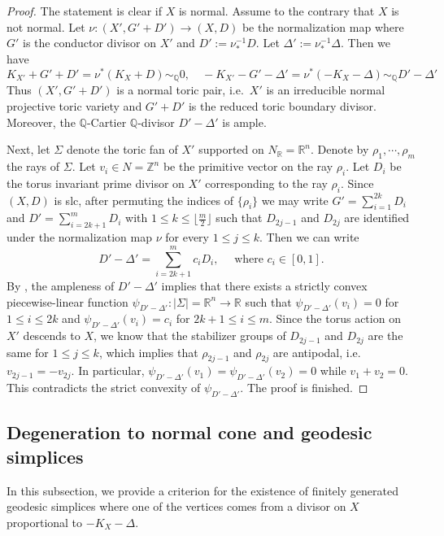 \documentclass[reqno, 12pt]{amsart}
\theoremstyle{definition}
\newcommand{\bR}{\mathbb{R}}
\newcommand{\bQ}{\mathbb{Q}}
\newcommand{\bZ}{\mathbb{Z}}
\numberwithin{equation}{section}
\begin{document}
\begin{proof}
The statement is clear if $X$ is normal. 
Assume to the contrary that $X$ is not normal.
Let $\nu: (X', G'+ D')\to (X,D)$ be the normalization map where $G'$ is the conductor divisor on $X'$ and $D':= \nu_*^{-1} D$. Let $\Delta':=\nu_*^{-1}\Delta$. Then we have 
\[
K_{X'}+ G' + D' = \nu^*(K_X+D)\sim_{\bQ} 0, \quad -K_{X'}- G' - \Delta' = \nu^*(-K_X-\Delta)\sim_{\bQ} D'-\Delta'
\]
Thus $(X', G'+D')$ is a normal toric pair, i.e.\ $X'$ is an irreducible normal projective toric variety and $G'+D'$ is the reduced toric boundary divisor. Moreover, the $\bQ$-Cartier $\bQ$-divisor $D'-\Delta'$ is ample.

Next, let $\Sigma$ denote the toric fan of $X'$ supported on $N_{\bR} = \bR^n$. Denote by $\rho_1,\cdots, \rho_m$  the rays of $\Sigma$. Let $v_{i}\in N = \bZ^n$ be the primitive vector on the ray $\rho_i$. Let $D_{i}$ be the torus invariant prime divisor on $X'$ corresponding to the ray $\rho_i$. Since $(X,D)$ is slc, after permuting the indices of $\{\rho_i\}$ we may write $G'= \sum_{i=1}^{2k} D_i$ and $D'=\sum_{i=2k+1}^{m} D_i$ with $1\leq k\leq \lfloor\frac{m}{2}\rfloor$ such that $D_{2j-1}$ and $D_{2j}$ are identified under the normalization map $\nu$ for every $1\leq j\leq k$. Then we can write 
\[
D'-\Delta' = \sum_{i=2k+1}^m c_i D_i, \quad \textrm{ where } c_i \in [0,1]. 
\]
By \cite[P. 70, Proposition]{Ful93}, the ampleness of $D'-\Delta'$ implies that there exists a strictly convex piecewise-linear function $\psi_{D'-\Delta'}:|\Sigma|=\bR^n\to \bR$ such that $\psi_{D'-\Delta'}(v_i) = 0$ for $1\leq i \leq 2k$ and $\psi_{D'-\Delta'}(v_i) = c_i$ for $2k+1\leq i\leq m$. Since the torus action on $X'$ descends to $X$, we know that the stabilizer groups of $D_{2j-1}$ and $D_{2j}$ are the same for $1\leq j\leq k$, which implies that $\rho_{2j-1}$ and $\rho_{2j}$ are antipodal, i.e.\ $v_{2j-1} = -v_{2j}$. In particular, $\psi_{D'-\Delta'}(v_1) = \psi_{D'-\Delta'}(v_2) = 0$ while $v_1+v_2=0$. This contradicts the strict convexity of $\psi_{D'-\Delta'}$. The proof is finished.
\end{proof}

\subsection{Degeneration to normal cone and geodesic simplices}\label{sec:geodesic-normal-cone}

In this subsection, we provide a criterion for the existence of finitely generated geodesic simplices where one of the vertices comes from a divisor on $X$ proportional to $-K_X-\Delta$.
\end{document}
